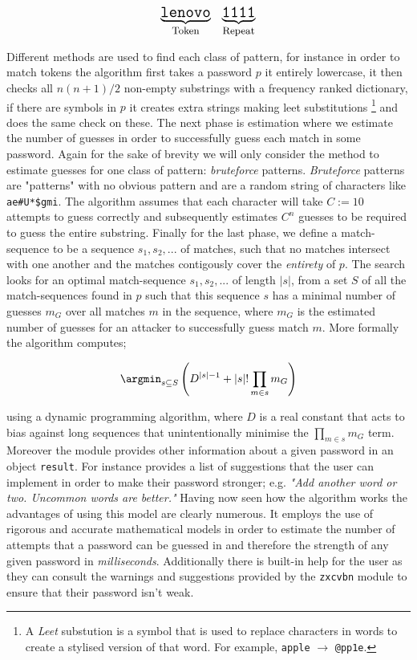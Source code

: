 \[
  \Large
  \underbrace{ \mathtt{lenovo} }_\text{\small Token} 
  \; \; \;
  \underbrace{ \mathtt{1111} }_\text{\small Repeat}
\]

Different methods are used to find each class of pattern, for 
instance in order to match tokens the algorithm first takes
a password $p$ it entirely lowercase, it then checks all 
$n(n+1)/2$ non-empty substrings with a frequency ranked
dictionary, if there are symbols in $p$ it creates extra 
strings making leet substitutions \footnote{A \textit{Leet}
substution is a symbol that is used to replace characters in words
to create a stylised version of that word. For example,
\texttt{apple} $\rightarrow$ \texttt{@pp1e}.}
and does the same check on these. The next phase is
estimation where we estimate the number of guesses in order
to successfully guess each match in some password. Again
for the sake of brevity we will only consider the method to 
estimate guesses for one class of pattern: \textit{bruteforce}
patterns. \textit{Bruteforce} patterns are "patterns" with no
obvious pattern and are a random string of characters like
\texttt{ae\#U*\$gmi}. The algorithm assumes that each
character will take $C := 10$ attempts to guess correctly and 
subsequently estimates $C^n$ guesses to be required to guess
the entire substring. Finally for the last phase, we define a
match-sequence to be a sequence $s_1, s_2, ...$ of matches, 
such that no matches intersect with one another and the
matches contigously cover the \textit{entirety} of $p$. 
The search looks
for an optimal match-sequence $s_1, s_2, ...$ of length
$\left|s\right|$, from a set $S$ of all the match-sequences
found in $p$ such that this sequence $s$ has a minimal number
of guesses $m_G$ over all matches $m$ in the sequence, where 
$m_G$ is the estimated number of guesses for an attacker to 
successfully guess match $m$. More formally the algorithm 
computes;

\[
  \argmin_{s \subseteq S} \left( D^{\left|s\right| -1} + 
  \left|s\right|! \prod_{m \in s} m_G \right)
\]

using a dynamic programming algorithm,
where $D$ is a real constant that acts to bias against long
sequences that unintentionally minimise the 
$\prod_{m \in s} m_G$ term. Moreover the module provides other
information about a given password in an object 
\texttt{result}. For instance 
 provides a list of 
suggestions that the user can implement in order to make their
password stronger; e.g. \textit{"Add another word or two.
Uncommon words are better."} Having now seen how the 
algorithm works the advantages of using this model are clearly
numerous. It employs the use of
rigorous and accurate mathematical models in order to estimate
the number of attempts that a password can be guessed in and 
therefore the strength of any given password in 
\emph{milliseconds}. Additionally there is built-in help for 
the user as they can consult the warnings and suggestions 
provided by the \texttt{zxcvbn} module to ensure that their
password isn't weak. \\ \vspace{0.2cm}

